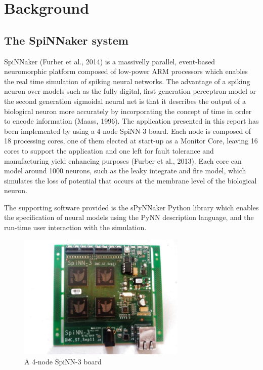 \documentclass[10pt]{article}
\begin{document}
    \section{Background}

    \subsection{The SpiNNaker system}

    SpiNNaker (Furber et al., 2014) is a massivelly parallel, event-based neuromorphic platform composed of low-power ARM processors which enables the real time simulation of spiking neural networks. The advantage of a spiking neuron over models such as the fully digital, first generation perceptron model or the second generation sigmoidal neural net is that it describes the output of a biological neuron more accurately by incorporating the concept of time in order to encode information (Maass, 1996). The application presented in this report has been implemented by using a 4 node SpiNN-3 board. Each node is composed of 18 processing cores, one of them elected at start-up as a Monitor Core, leaving 16 cores to support the application and one left for fault tolerance and manufacturing yield enhancing purposes (Furber et al., 2013). Each core can model around 1000 neurons, such as the leaky integrate and fire model, which simulates the loss of potential that occurs at the membrane level of the biological neuron.

    The supporting software provided is the sPyNNaker Python library which enables the specification of neural models using the PyNN description language, and the run-time user interaction with the simulation.

    \begin{figure}[ht!]
    \centering
    \includegraphics[width=80mm]{./SpiNN-3.jpg}
    \caption{A 4-node SpiNN-3 board \label{overflow}}
    \end{figure}
\end{document}
